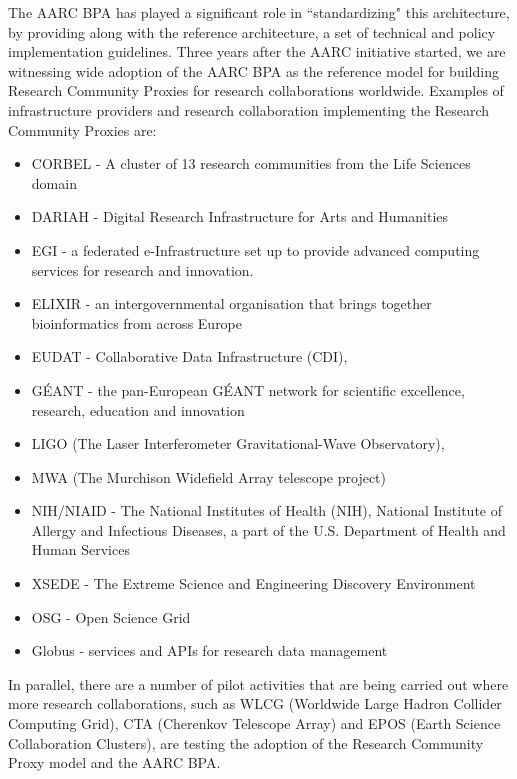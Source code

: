 \documentclass[fleqn,10pt]{wlscirep}
\begin{document}
{The AARC BPA has played a significant role in ``standardizing" this architecture, by providing along with the reference architecture, a set of technical and policy implementation guidelines\cite{aarcguidelines}. Three years after the AARC initiative started, we are witnessing wide adoption of the AARC BPA as the reference model for building Research Community Proxies for research collaborations worldwide. Examples of infrastructure providers and research collaboration implementing the Research Community Proxies are:
\begin{itemize}
  \item CORBEL - A cluster of 13 research communities from the Life Sciences domain
  \item   DARIAH - Digital Research Infrastructure for Arts and Humanities
  \item EGI - a federated e-Infrastructure set up to provide advanced computing services for research and innovation.
  \item ELIXIR - an intergovernmental organisation that brings together bioinformatics from across Europe
  \item EUDAT -  Collaborative Data Infrastructure (CDI),
  \item GÉANT - the pan-European GÉANT network for scientific excellence, research, education and innovation
  \item LIGO (The Laser Interferometer Gravitational-Wave Observatory),
  \item MWA (The Murchison Widefield Array telescope project)
  \item NIH/NIAID - The National Institutes of Health (NIH), National Institute of Allergy and Infectious Diseases, a part of the U.S. Department of Health and Human Services
  \item XSEDE - The Extreme Science and Engineering Discovery Environment
  \item OSG - Open Science Grid
  \item Globus - services and APIs for research data management
\end{itemize}
In parallel, there are a number of pilot activities that are being carried out where more research collaborations, such as WLCG (Worldwide Large Hadron Collider Computing Grid), CTA (Cherenkov Telescope Array)  and EPOS (Earth Science Collaboration Clusters), are testing the adoption of the Research Community Proxy model and the AARC BPA. 

}
\end{document}
